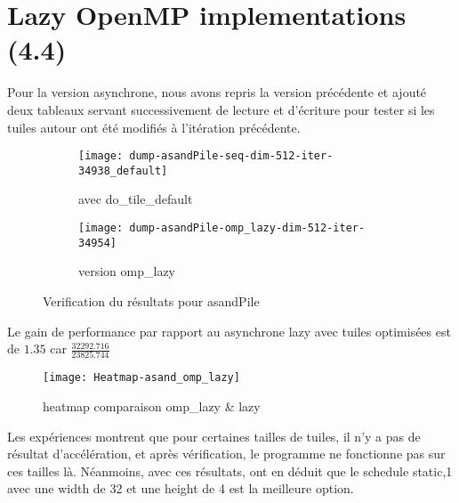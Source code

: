\documentclass[10pt, a4paper]{article}
\begin{document}
\section{Lazy OpenMP implementations (4.4)}

Pour la version asynchrone, nous avons repris la version précédente et ajouté deux tableaux
servant successivement de lecture et d'écriture pour tester si les tuiles autour ont été modifiés à l'itération précédente.

\begin{figure}[H]
    \centering
    \begin{subfigure}{.4\textwidth}
        \texttt{[image: dump-asandPile-seq-dim-512-iter-34938\_default]}
        \caption{\small{avec do\_tile\_default}}
        \label{fig:asandPile_default}
    \end{subfigure}
    \begin{subfigure}{.4\textwidth}
        \texttt{[image: dump-asandPile-omp\_lazy-dim-512-iter-34954]}
        \caption{\small{version omp\_lazy}}
        \label{fig:asandPile_opt}
    \end{subfigure}
    \caption{Verification du résultats pour asandPile}
\end{figure}

Le gain de performance par rapport au asynchrone lazy avec tuiles optimisées est de $1.35$ car $\frac{32292.716}{23825.744}$

\begin{figure}[H]
    \centering
    \texttt{[image: Heatmap-asand\_omp\_lazy]}
    \caption{\small{heatmap comparaison omp\_lazy \& lazy}}
    \label{fig:heatmaplazy}
\end{figure}

Les expériences montrent que pour certaines tailles de tuiles, il n'y a pas de résultat d'accélération, et après vérification, le programme ne fonctionne pas sur ces tailles là.
Néanmoins, avec ces résultats, ont en déduit que le schedule static,1 avec une width de 32 et une height de 4 est la meilleure option.


\end{document}
